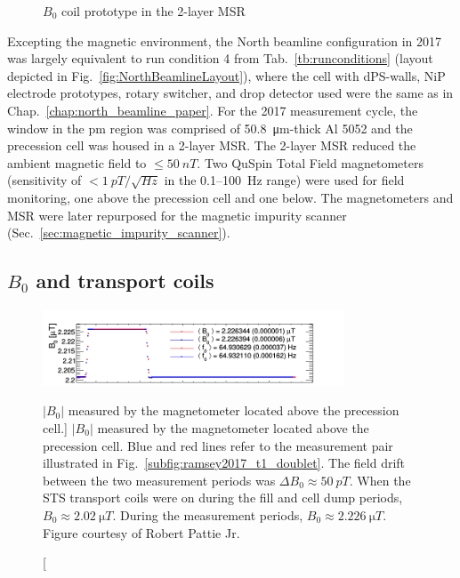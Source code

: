 \begin{figure}[hb]
\begin{minipage}{.45\textwidth}
    \caption
    {$B_0$ coil prototype in the 2-layer MSR}
    \label{fig:ramsey_2017_B0_coil_prototype}
\end{minipage}
\end{figure}

Excepting the magnetic environment, the North beamline configuration in 2017 was largely equivalent to run condition 4 from Tab.~\ref{tb:runconditions} (layout depicted in Fig.~\ref{fig:NorthBeamlineLayout}), where the cell with dPS-walls, NiP electrode prototypes, rotary switcher, and drop detector used were the same as in Chap.~\ref{chap:north_beamline_paper}. For the 2017 measurement cycle, the window in the \acrshort{pm} region was comprised of \qty{50.8}{\micro\meter}-thick Al 5052 and the precession cell was housed in a 2-layer MSR. The 2-layer MSR reduced the ambient magnetic field to $\leq \qty{50}{nT}$. Two QuSpin Total Field magnetometers (sensitivity of $<\qty{1}{pT\per\sqrt{Hz}}$ in the 0.1--\qty{100}{\hertz} range) were used for field monitoring, one above the precession cell and one below. The magnetometers and MSR were later repurposed for the magnetic impurity scanner (Sec.~\ref{sec:magnetic_impurity_scanner}).


\subsection
{
    \texorpdfstring{$B_0$ and transport coils}
                    {B0 and transport coils}
}


\begin{figure}
    \centering
    \includegraphics[width=0.8\textwidth]{figures/ramsey2017_B0.png}
    \caption
    [$|B_0|$ measured by the magnetometer located above the precession cell.]
    {$|B_0|$ measured by the magnetometer located above the precession cell. Blue and red lines refer to the measurement pair illustrated in Fig.~\ref{subfig:ramsey2017_t1_doublet}. The field drift between the two measurement periods was $\Delta B_0\approx\qty{50}{pT}$. When the STS transport coils were on during the fill and cell dump periods, $B_0\approx\qty{2.02}{\micro T}$.  During the measurement periods, $B_0\approx\qty{2.226}{\micro T}$. Figure courtesy of Robert Pattie Jr.}
    \label{fig:ramsey_2017_b0_map}
\end{figure}

